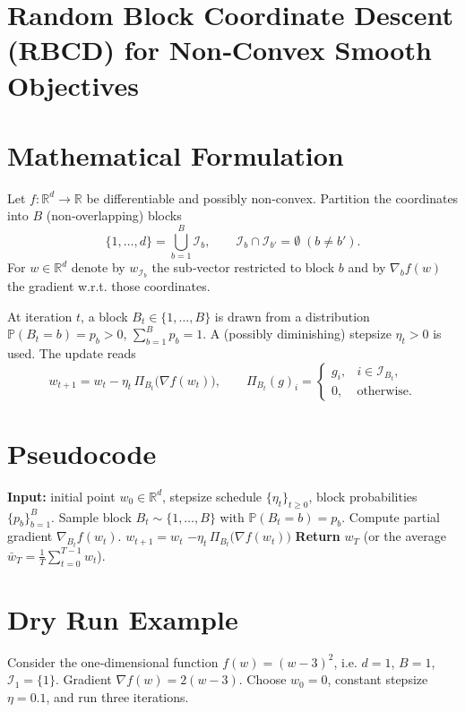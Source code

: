 \documentclass{article}
\newcommand{\R}{\mathbb{R}}
\begin{document}
\section*{Random Block Coordinate Descent (RBCD) for Non‑Convex Smooth Objectives}

\section*{Mathematical Formulation}
Let $f:\R^{d}\rightarrow\R$ be differentiable and possibly non‑convex.  
Partition the coordinates into $B$ (non‑overlapping) blocks  
\[
\{1,\dots ,d\}= \bigcup_{b=1}^{B}\mathcal{I}_{b},\qquad 
\mathcal{I}_{b}\cap\mathcal{I}_{b'}=\emptyset\;(b\neq b').
\]
For $w\in\R^{d}$ denote by $w_{\mathcal{I}_{b}}$ the sub‑vector restricted to block $b$ and by
$\nabla_{b} f(w)$ the gradient w.r.t. those coordinates.

At iteration $t$, a block $B_{t}\in\{1,\dots ,B\}$ is drawn from a distribution
$\mathbb{P}(B_{t}=b)=p_{b}>0$, $\sum_{b=1}^{B}p_{b}=1$.  
A (possibly diminishing) stepsize $\eta_{t}>0$ is used.  
The update reads
\[
w_{t+1}= w_{t}
-\eta_{t}\, \Pi_{B_{t}}\bigl(\nabla f(w_{t})\bigr),\qquad 
\Pi_{B_{t}}(g)_{i}= 
\begin{cases}
g_{i}, & i\in\mathcal{I}_{B_{t}},\\
0, & \text{otherwise}.
\end{cases}
\tag{1}
\]

\section*{Pseudocode}
\begin{algorithm}[H]
\caption{Random Block Coordinate Descent (RBCD)}
\begin{algorithmic}[1]
\STATE \textbf{Input:} initial point $w_{0}\in\R^{d}$, stepsize schedule $\{\eta_{t}\}_{t\ge 0}$, block probabilities $\{p_{b}\}_{b=1}^{B}$.
    \STATE Sample block $B_{t}\sim\{1,\dots ,B\}$ with $\mathbb{P}(B_{t}=b)=p_{b}$.
    \STATE Compute partial gradient $\nabla_{B_{t}} f(w_{t})$.
    \STATE $w_{t+1}= w_{t}$ 
    \STATE \hspace{1.5em}$-\eta_{t}\,\Pi_{B_{t}}\bigl(\nabla f(w_{t})\bigr)$
\ENDFOR
\STATE \textbf{Return} $w_{T}$ (or the average $\bar w_T=\frac1T\sum_{t=0}^{T-1}w_{t}$).
\end{algorithmic}
\end{algorithm}

\section*{Dry Run Example}
Consider the one‑dimensional function $f(w)=(w-3)^{2}$, i.e. $d=1$, $B=1$, $\mathcal{I}_{1}=\{1\}$.  
Gradient $\nabla f(w)=2(w-3)$.  
Choose $w_{0}=0$, constant stepsize $\eta=0.1$, and run three iterations.
\end{document}
